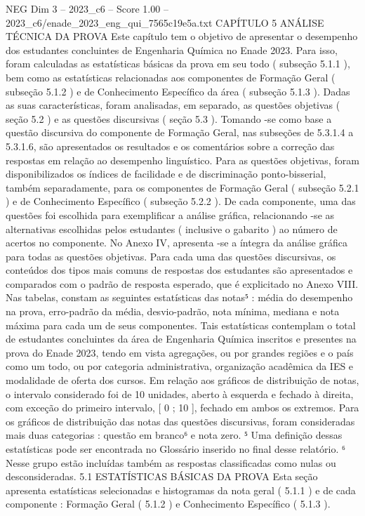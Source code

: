 \begin{textsample}{NEG Dim 3 – 2023\_c6 – Score 1.00 – 2023\_c6/enade\_2023\_eng\_qui\_7565c19e5a.txt}  \label{ex:f3_neg_176}
CAPÍTULO 5 ANÁLISE TÉCNICA DA PROVA Este capítulo tem o objetivo de apresentar o desempenho dos estudantes concluintes de Engenharia Química no Enade 2023.
Para isso, foram calculadas as estatísticas básicas da prova em seu todo ( subseção 5.1.1 ), bem como as estatísticas relacionadas aos componentes de Formação Geral ( subseção 5.1.2 ) e de Conhecimento Específico da área ( subseção 5.1.3 ).
Dadas as suas características, foram analisadas, em separado, as questões objetivas ( seção 5.2 ) e as questões discursivas ( seção 5.3 ).
Tomando -se como base a questão discursiva do componente de Formação Geral, nas subseções de 5.3.1.4 a 5.3.1.6, são apresentados os resultados e os comentários sobre a correção das respostas em relação ao desempenho linguístico.
Para as questões objetivas, foram disponibilizados os índices de facilidade e de discriminação ponto-bisserial, também separadamente, para os componentes de Formação Geral ( subseção 5.2.1 ) e de Conhecimento Específico ( subseção 5.2.2 ).
De cada componente, uma das questões foi escolhida para exemplificar a análise gráfica, relacionando -se as alternativas escolhidas pelos estudantes ( inclusive o gabarito ) ao número de acertos no componente.
No Anexo IV, apresenta -se a íntegra da análise gráfica para todas as questões objetivas.
Para cada uma das questões discursivas, os conteúdos dos tipos mais comuns de respostas dos estudantes são apresentados e comparados com o padrão de resposta esperado, que é explicitado no Anexo VIII.
Nas tabelas, constam as seguintes estatísticas das notas⁵ : média do desempenho na prova, erro-padrão da média, desvio-padrão, nota mínima, mediana e nota máxima para cada um de seus componentes.
Tais estatísticas contemplam o total de estudantes concluintes da área de Engenharia Química inscritos e presentes na prova do Enade 2023, tendo em vista agregações, ou por grandes regiões e o país como um todo, ou por categoria administrativa, organização acadêmica da IES e modalidade de oferta dos cursos.
Em relação aos gráficos de distribuição de notas, o intervalo considerado foi de 10 unidades, aberto à esquerda e fechado à direita, com exceção do primeiro intervalo, [ 0 ; 10 ], fechado em ambos os extremos.
Para os gráficos de distribuição das notas das questões discursivas, foram consideradas mais duas categorias : questão em branco⁶ e nota zero. ⁵ Uma definição dessas estatísticas pode ser encontrada no Glossário inserido no final desse relatório. ⁶ Nesse grupo estão incluídas também as respostas classificadas como nulas ou desconsideradas. 5.1 ESTATÍSTICAS BÁSICAS DA PROVA Esta seção apresenta estatísticas selecionadas e histogramas da nota geral ( 5.1.1 ) e de cada componente : Formação Geral ( 5.1.2 ) e Conhecimento Específico ( 5.1.3 ).

\end{textsample}

